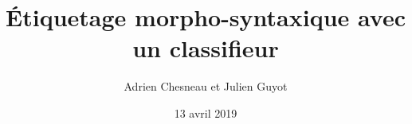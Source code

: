 \documentclass{article}
\title{Étiquetage morpho-syntaxique avec un classifieur}
\date{13 avril 2019}
\author{Adrien Chesneau et Julien Guyot}
\begin{document}
\onehalfspacing
\maketitle










\end{document}

